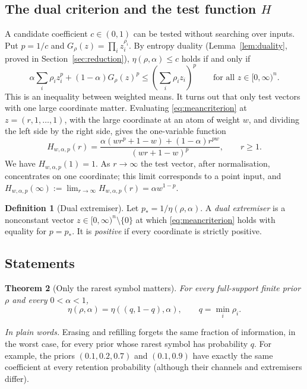 \documentclass[11pt,a4paper]{article}
\numberwithin{equation}{section}
\newtheorem{theorem}{Theorem}[section]
\theoremstyle{definition}
\newtheorem{definition}[theorem]{Definition}
\theoremstyle{remark}
\newcommand{\plain}[1]{\par\smallskip\noindent\textit{In plain words.} #1\par\smallskip}
\begin{document}
\subsection{The dual criterion and the test function \texorpdfstring{\(H\)}{H}}

A candidate coefficient \(c\in(0,1)\) can be tested without searching over
inputs. Put \(p=1/c\) and \(G_\rho(z)=\prod_i z_i^{\rho_i}\). By entropy
duality (Lemma~\ref{lem:duality}, proved in Section~\ref{sec:reduction}),
\(\eta(\rho,\alpha)\le c\) holds if and only if
\begin{equation}\label{eq:meancriterion}
\alpha\sum_i\rho_i z_i^p+(1-\alpha)G_\rho(z)^p
\le\left(\sum_i\rho_i z_i\right)^p
\qquad\text{for all }z\in[0,\infty)^n .
\end{equation}
This is an inequality between weighted means. It turns out that only test
vectors with one large coordinate matter. Evaluating
\eqref{eq:meancriterion} at \(z=(r,1,\ldots,1)\), with the large coordinate
at an atom of weight \(w\), and dividing the left side by the right side,
gives the one-variable function
\begin{equation}\label{eq:H}
H_{w,\alpha,p}(r)=
\frac{\alpha(wr^p+1-w)+(1-\alpha)r^{pw}}
{(wr+1-w)^p},\qquad r\ge1.
\end{equation}
We have \(H_{w,\alpha,p}(1)=1\). As \(r\to\infty\) the test vector, after
normalisation, concentrates on one coordinate; this limit corresponds to a
point input, and \(H_{w,\alpha,p}(\infty):=\lim_{r\to\infty}
H_{w,\alpha,p}(r)=\alpha w^{1-p}\).

\begin{definition}[Dual extremiser]\label{def:dualext}
Let \(p_*=1/\eta(\rho,\alpha)\). A \emph{dual extremiser} is a nonconstant
vector \(z\in[0,\infty)^n\setminus\{0\}\) at which \eqref{eq:meancriterion}
holds with equality for \(p=p_*\). It is \emph{positive} if every
coordinate is strictly positive.
\end{definition}

\subsection{Statements}

\begin{theorem}[Only the rarest symbol matters]\label{thm:reduction}
For every full-support finite prior \(\rho\) and every \(0<\alpha<1\),
\begin{equation}\label{eq:minreduction}
\eta(\rho,\alpha)=\eta((q,1-q),\alpha),\qquad q=\min_i\rho_i.
\end{equation}
\end{theorem}
\plain{Erasing and refilling forgets the same fraction of information,
in the worst case, for every prior whose rarest symbol has probability
\(q\). For example, the priors \((0.1,0.2,0.7)\) and \((0.1,0.9)\) have
exactly the same coefficient at every retention probability (although their
channels and extremisers differ).}
\end{document}

